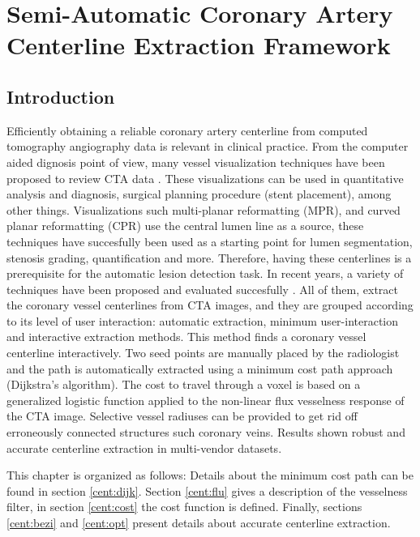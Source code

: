 \chapter{Semi-Automatic Coronary Artery Centerline Extraction Framework}\label{cent:cent}
%

\section{Introduction}
%
Efficiently obtaining a reliable coronary artery centerline from computed tomography angiography data is relevant in clinical practice. From the computer aided dignosis point of view, many vessel visualization techniques have been proposed to review CTA data \citep{Cademartiri2007}.  These visualizations can be used in quantitative analysis and diagnosis, surgical planning procedure (stent placement), among other things. Visualizations such multi-planar reformatting (MPR), and curved planar reformatting \citep{Kanitsar2002} (CPR) use the central lumen line as a source, these techniques have succesfully been used as a starting point for lumen segmentation, stenosis grading, quantification and more. Therefore, having these centerlines is a prerequisite for the automatic lesion detection task.
In recent years, a variety of techniques have been proposed and evaluated succesfully \citep{Schaap2009}. All of them, extract the coronary vessel centerlines from CTA images, and they are grouped according to its level of user interaction: automatic extraction, minimum user-interaction and interactive extraction methods.
This method finds a coronary vessel centerline interactively. Two seed points are manually placed by the radiologist and the path is automatically extracted using a minimum cost path approach (Dijkstra’s algorithm). The cost to travel through a voxel is based on a generalized logistic function applied to the non-linear flux vesselness response \citep{Lesage2009a}  of the CTA image. Selective vessel radiuses can be provided to get rid off erroneously connected structures such coronary veins. Results shown robust and accurate centerline extraction in multi-vendor datasets.

This chapter is organized as follows: Details about the minimum cost path can be found in section \ref{cent:dijk}. Section \ref{cent:flu} gives a description of the vesselness filter, in section \ref{cent:cost} the cost function is defined. Finally, sections \ref{cent:bezi} and \ref{cent:opt} present details about accurate centerline extraction.

